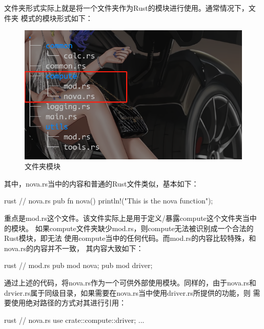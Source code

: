 文件夹形式实际上就是将一个文件夹作为Rust的模块进行使用。通常情况下，文件夹
模式的模块形式如下：
\begin{figure}[H]
  \centering
  \includegraphics[scale=0.5]{rust_mod_directory.png}
  \caption{文件夹模块}
  \label{fig:rust_mod_directory}
\end{figure}
其中，nova.rs当中的内容和普通的Rust文件类似，基本如下：
\begin{code-block}{rust}
// nova.rs
pub fn nova() {
    println!("This is the nova function");
}
\end{code-block}
重点是mod.rs这个文件。该文件实际上是用于定义/暴露compute这个文件夹当中的模块。
如果compute文件夹缺少mod.rs，则compute无法被识别成一个合法的Rust模块，即无法
使用compute当中的任何代码。而mod.rs的内容比较特殊，和nova.rs的内容并不一致，
其内容大致如下：
\begin{code-block}{rust}
// mod.rs
pub mod nova;
pub mod driver;
\end{code-block}
通过上述的代码，将nova.rs作为一个可供外部使用模块。同样的，由于nova.rs和
drvier.rs属于同级目录，如果需要在nova.rs当中使用driver.rs所提供的功能，则
需要使用绝对路径的方式对其进行引用：
\begin{code-block}{rust}
// nova.rs
use crate::compute::driver;
...
\end{code-block}

